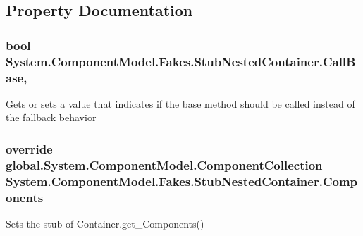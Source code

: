 \subsection{Property Documentation}
\hypertarget{class_system_1_1_component_model_1_1_fakes_1_1_stub_nested_container_aef7c0c22ee8d41442fe4f5442d680474}{
\subsubsection[{Call\-Base}]{\setlength{\rightskip}{0pt plus 5cm}bool System.\-Component\-Model.\-Fakes.\-Stub\-Nested\-Container.\-Call\-Base\hspace{0.3cm}{\ttfamily [get]}, {\ttfamily [set]}}}\label{class_system_1_1_component_model_1_1_fakes_1_1_stub_nested_container_aef7c0c22ee8d41442fe4f5442d680474}


Gets or sets a value that indicates if the base method should be called instead of the fallback behavior

\hypertarget{class_system_1_1_component_model_1_1_fakes_1_1_stub_nested_container_a6aad5575d71c729bf4368904d7a118e1}{
\subsubsection[{Components}]{\setlength{\rightskip}{0pt plus 5cm}override global.\-System.\-Component\-Model.\-Component\-Collection System.\-Component\-Model.\-Fakes.\-Stub\-Nested\-Container.\-Components\hspace{0.3cm}{\ttfamily [get]}}}\label{class_system_1_1_component_model_1_1_fakes_1_1_stub_nested_container_a6aad5575d71c729bf4368904d7a118e1}


Sets the stub of Container.\-get\-\_\-\-Components()

